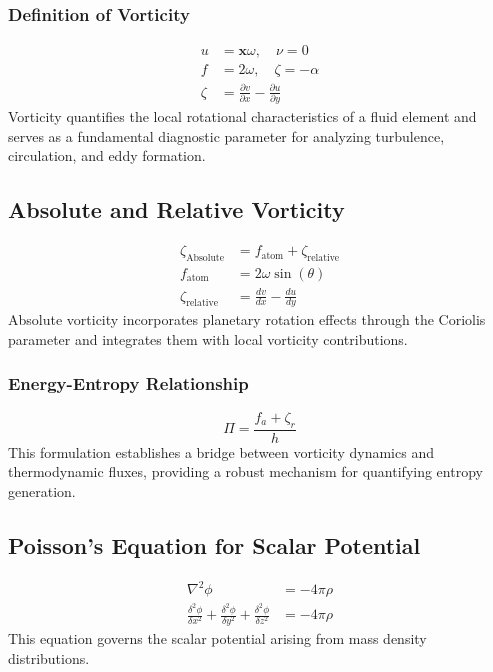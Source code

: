     \subsubsection*{Definition of Vorticity}
    \begin{align}
        u &= \boldsymbol{x} \omega, \quad \nu=0 \\
        f &= 2 \omega, \quad \zeta=-\alpha \\
        \zeta &= \frac{\partial v}{\partial x} - \frac{\partial u}{\partial y}
    \end{align}
    Vorticity quantifies the local rotational characteristics of a fluid element and serves as a fundamental diagnostic parameter for analyzing turbulence, circulation, and eddy formation.

    \subsection*{Absolute and Relative Vorticity}
    \begin{align}
        \zeta_\text{Absolute} &= f_\text{atom} + \zeta_\text{relative} \\
        f_\text{atom} &= 2 \omega \sin(\theta) \\
        \zeta_{\text {relative }} &=\frac{d v}{d x}-\frac{d u}{d y}
    \end{align}
    Absolute vorticity incorporates planetary rotation effects through the Coriolis parameter and integrates them with local vorticity contributions.

    \subsubsection*{Energy-Entropy Relationship}
    \begin{equation*}
        \Pi = \frac{f_a + \zeta_r}{h}
    \end{equation*}
    This formulation establishes a bridge between vorticity dynamics and thermodynamic fluxes, providing a robust mechanism for quantifying entropy generation.

    \subsection*{Poisson's Equation for Scalar Potential}
    \begin{align}
        \nabla^2 \phi &= -4 \pi \rho \\
        \frac{\delta^2 \phi}{\delta x^2}+\frac{\delta^2 \phi}{\delta y^2}+\frac{\delta^2 \phi}{\delta z^2} &= -4 \pi \rho
    \end{align}
    This equation governs the scalar potential arising from mass density distributions.

